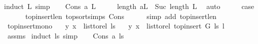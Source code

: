 \begin{isabellebody}
\isadelimproof
%
\endisadelimproof
%
\isatagproof
{}\isamarkupfalse%
{\isacharparenleft}{\kern0pt}induct\ L{\isacharcomma}{\kern0pt}\ simp{\isacharparenright}{\kern0pt}\isanewline
\ \ \isamarkupfalse%
\ {\isacharparenleft}{\kern0pt}Cons\ a\ L{\isacharparenright}{\kern0pt}\isanewline
\ \ \isamarkupfalse%
\ \isamarkupfalse%
\ {\isachardoublequoteopen}length\ {\isacharparenleft}{\kern0pt}a{\isacharhash}{\kern0pt}L{\isacharparenright}{\kern0pt}\ {\isacharequal}{\kern0pt}\ Suc\ {\isacharparenleft}{\kern0pt}length\ L{\isacharparenright}{\kern0pt}{\isachardoublequoteclose}\ \isamarkupfalse%
\ auto\isanewline
\ \ \isamarkupfalse%
\ \isamarkupfalse%
\ {\isacharquery}{\kern0pt}case\ \isamarkupfalse%
\isanewline
\ \ \ \ \ \ top{\isacharunderscore}{\kern0pt}insert{\isacharunderscore}{\kern0pt}len\ top{\isacharunderscore}{\kern0pt}sort{\isachardot}{\kern0pt}simps{\isacharparenleft}{\kern0pt}{}{\isacharparenright}{\kern0pt}\ Cons\isanewline
\ \ \ \ \isamarkupfalse%
\ {\isacharparenleft}{\kern0pt}simp\ add{\isacharcolon}{\kern0pt}\ top{\isacharunderscore}{\kern0pt}insert{\isacharunderscore}{\kern0pt}len{\isacharparenright}{\kern0pt}\ \ \isanewline
{}\isamarkupfalse%
%
\endisatagproof
{\isafoldproof}%
%
\isadelimproof
\isanewline
%
\endisadelimproof
\isanewline
{}\isamarkupfalse%
\ top{\isacharunderscore}{\kern0pt}insert{\isacharunderscore}{\kern0pt}mono{\isacharcolon}{\kern0pt}\isanewline
\ \ \ {\isachardoublequoteopen}{\isacharparenleft}{\kern0pt}y{\isacharcomma}{\kern0pt}\ x{\isacharparenright}{\kern0pt}\ {\isasymin}\ list{\isacharunderscore}{\kern0pt}to{\isacharunderscore}{\kern0pt}rel\ ls{\isachardoublequoteclose}\isanewline
\ \ \ {\isachardoublequoteopen}{\isacharparenleft}{\kern0pt}y{\isacharcomma}{\kern0pt}\ x{\isacharparenright}{\kern0pt}\ {\isasymin}\ list{\isacharunderscore}{\kern0pt}to{\isacharunderscore}{\kern0pt}rel\ {\isacharparenleft}{\kern0pt}top{\isacharunderscore}{\kern0pt}insert\ G\ ls\ l{\isacharparenright}{\kern0pt}{\isachardoublequoteclose}\isanewline
%
\isadelimproof
\ \ %
\endisadelimproof
%
\isatagproof
{}\isamarkupfalse%
\ assms\ \isanewline
{}\isamarkupfalse%
{\isacharparenleft}{\kern0pt}induct\ ls{\isacharcomma}{\kern0pt}\ simp{\isacharparenright}{\kern0pt}\isanewline
\ \ \isamarkupfalse%
\ {\isacharparenleft}{\kern0pt}Cons\ a\ ls{\isacharparenright}{\kern0pt}\isanewline

\end{isabellebody}
